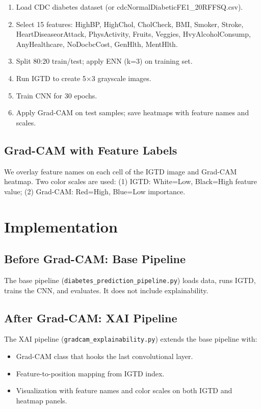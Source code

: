 \documentclass[12pt]{dalthesis}
\begin{document}
\begin{enumerate}
\item Load CDC diabetes dataset (or cdcNormalDiabeticFE1\_20RFFSQ.csv).
\item Select 15 features: HighBP, HighChol, CholCheck, BMI, Smoker, Stroke, HeartDiseaseorAttack, PhysActivity, Fruits, Veggies, HvyAlcoholConsump, AnyHealthcare, NoDocbcCost, GenHlth, MentHlth.
\item Split 80:20 train/test; apply ENN (k=3) on training set.
\item Run IGTD to create 5$\times$3 grayscale images.
\item Train CNN for 30 epochs.
\item Apply Grad-CAM on test samples; save heatmaps with feature names and scales.
\end{enumerate}

\section{Grad-CAM with Feature Labels}

We overlay feature names on each cell of the IGTD image and Grad-CAM heatmap. Two color scales are used: (1) IGTD: White=Low, Black=High feature value; (2) Grad-CAM: Red=High, Blue=Low importance.

\chapter{Implementation}\label{ch:impl}

\section{Before Grad-CAM: Base Pipeline}

The base pipeline (\texttt{diabetes\_prediction\_pipeline.py}) loads data, runs IGTD, trains the CNN, and evaluates. It does not include explainability.

\section{After Grad-CAM: XAI Pipeline}

The XAI pipeline (\texttt{gradcam\_explainability.py}) extends the base pipeline with:
\begin{itemize}
\item Grad-CAM class that hooks the last convolutional layer.
\item Feature-to-position mapping from IGTD index.
\item Visualization with feature names and color scales on both IGTD and heatmap panels.
\end{itemize}
\end{document}
